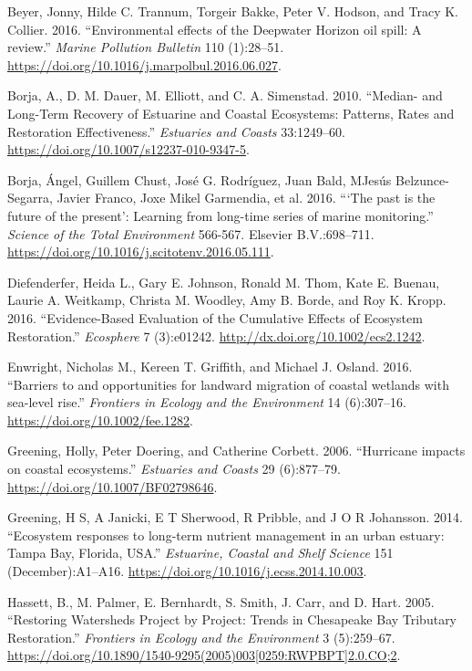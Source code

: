 \documentclass[]{article}
\begin{document}
\leavevmode\hypertarget{ref-Beyer16}{}%
Beyer, Jonny, Hilde C. Trannum, Torgeir Bakke, Peter V. Hodson, and
Tracy K. Collier. 2016. ``Environmental effects of the Deepwater Horizon
oil spill: A review.'' \emph{Marine Pollution Bulletin} 110 (1):28--51.
\url{https://doi.org/10.1016/j.marpolbul.2016.06.027}.

\leavevmode\hypertarget{ref-Borja10}{}%
Borja, A., D. M. Dauer, M. Elliott, and C. A. Simenstad. 2010. ``Median-
and Long-Term Recovery of Estuarine and Coastal Ecosystems: Patterns,
Rates and Restoration Effectiveness.'' \emph{Estuaries and Coasts}
33:1249--60. \url{https://doi.org/10.1007/s12237-010-9347-5}.

\leavevmode\hypertarget{ref-Borja16}{}%
Borja, Ángel, Guillem Chust, José G. Rodríguez, Juan Bald,
M\textordfeminine Jesús Belzunce-Segarra, Javier Franco, Joxe Mikel
Garmendia, et al. 2016. ```The past is the future of the present':
Learning from long-time series of marine monitoring.'' \emph{Science of
the Total Environment} 566-567. Elsevier B.V.:698--711.
\url{https://doi.org/10.1016/j.scitotenv.2016.05.111}.

\leavevmode\hypertarget{ref-Diefenderfer16}{}%
Diefenderfer, Heida L., Gary E. Johnson, Ronald M. Thom, Kate E. Buenau,
Laurie A. Weitkamp, Christa M. Woodley, Amy B. Borde, and Roy K. Kropp.
2016. ``Evidence-Based Evaluation of the Cumulative Effects of Ecosystem
Restoration.'' \emph{Ecosphere} 7 (3):e01242.
\url{http://dx.doi.org/10.1002/ecs2.1242}.

\leavevmode\hypertarget{ref-Enwright16}{}%
Enwright, Nicholas M., Kereen T. Griffith, and Michael J. Osland. 2016.
``Barriers to and opportunities for landward migration of coastal
wetlands with sea-level rise.'' \emph{Frontiers in Ecology and the
Environment} 14 (6):307--16. \url{https://doi.org/10.1002/fee.1282}.

\leavevmode\hypertarget{ref-Greening06b}{}%
Greening, Holly, Peter Doering, and Catherine Corbett. 2006. ``Hurricane
impacts on coastal ecosystems.'' \emph{Estuaries and Coasts} 29
(6):877--79. \url{https://doi.org/10.1007/BF02798646}.

\leavevmode\hypertarget{ref-Greening2014}{}%
Greening, H S, A Janicki, E T Sherwood, R Pribble, and J O R Johansson.
2014. ``Ecosystem responses to long-term nutrient management in an urban
estuary: Tampa Bay, Florida, USA.'' \emph{Estuarine, Coastal and Shelf
Science} 151 (December):A1--A16.
\url{https://doi.org/10.1016/j.ecss.2014.10.003}.

\leavevmode\hypertarget{ref-Hassett05}{}%
Hassett, B., M. Palmer, E. Bernhardt, S. Smith, J. Carr, and D. Hart.
2005. ``Restoring Watersheds Project by Project: Trends in Chesapeake
Bay Tributary Restoration.'' \emph{Frontiers in Ecology and the
Environment} 3 (5):259--67.
\href{https://doi.org/10.1890/1540-9295(2005)003\%5B0259:RWPBPT\%5D2.0.CO;2}{https://doi.org/10.1890/1540-9295(2005)003{[}0259:RWPBPT{]}2.0.CO;2}.
\end{document}

